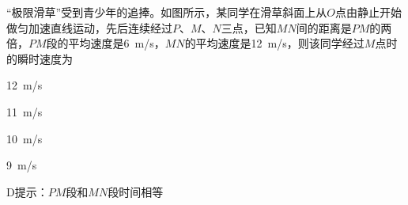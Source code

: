 ``极限滑草''受到青少年的追捧。如图所示，某同学在滑草斜面上从\(O\)点由静止开始做匀加速直线运动，先后连续经过\(P\)、\(M\)、\(N\)三点，已知\(MN\)间的距离是\(PM\)的两倍，\(PM\)段的平均速度是\qty{6}{m/s}，\(MN\)的平均速度是\qty{12}{m/s}，则该同学经过\(M\)点时的瞬时速度为\paren[D]

\begin{choices}
	\item \qty{12}{m/s}
	\item \qty{11}{m/s}
	\item \qty{10}{m/s}
	\item \qty{9}{m/s}
\end{choices}
\begin{answer}
	D\qquad 提示：\(PM\)段和\(MN\)段时间相等
\end{answer}